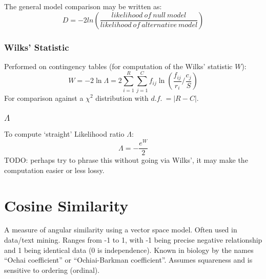 \documentclass[11pt]{article}
\begin{document}

The general model comparison may be written as:
$$
D = -2ln \left( \frac{ likelihood~of~null~model }{ likelihood~of~alternative~model } \right)
$$




\subsubsection{Wilks' Statistic}
Performed on contingency tables (for computation of the Wilks' statistic $W$):
$$
W = -2\ln\Lambda = 2 \sum_{i=1}^{R}{ \sum_{j=1}^{C}{ f_{ij}\ln \left( { \frac{f_{ij}}{r_i}  \bigg/  \frac{c_j}{S}  }  \right)   }}
$$
For comparison against a $\chi^2$ distribution with $d.f.~= |R-C|$.


\subsubsection{$\Lambda$}
To compute `straight' Likelihood ratio $\Lambda$:
$$
\Lambda = - \frac{ e^W }{ 2 }
$$
TODO: perhaps try to phrase this without going via Wilks', it may make the computation easier or less lossy.







\section{Cosine Similarity}
A measure of angular similarity using a vector space model.  Often used in data/text mining.  Ranges from -1 to 1, with -1 being precise negative relationship and 1 being identical data (0 is independence).  Known in biology by the names ``Ochai coefficient'' or ``Ochiai-Barkman coefficient''.  Assumes squareness and is sensitive to ordering (ordinal).
\end{document}
